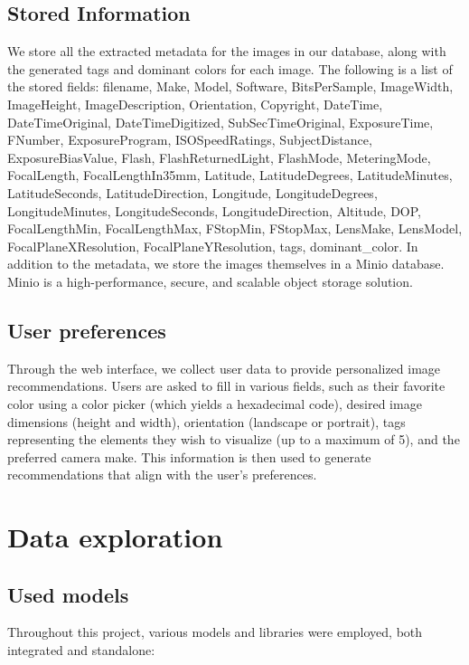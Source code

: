 \documentclass{article}
\begin{document}
    \subsection{Stored Information}\label{subsec:stored_infos}
    We store all the extracted metadata for the images in our database, along with the generated tags and dominant colors for each image.
    The following is a list of the stored fields: filename, Make, Model, Software, BitsPerSample, ImageWidth, ImageHeight, ImageDescription, Orientation, Copyright, DateTime, DateTimeOriginal, DateTimeDigitized, SubSecTimeOriginal, ExposureTime, FNumber, ExposureProgram, ISOSpeedRatings, SubjectDistance, ExposureBiasValue, Flash, FlashReturnedLight, FlashMode, MeteringMode, FocalLength, FocalLengthIn35mm, Latitude, LatitudeDegrees, LatitudeMinutes, LatitudeSeconds, LatitudeDirection, Longitude, LongitudeDegrees, LongitudeMinutes, LongitudeSeconds, LongitudeDirection, Altitude, DOP, FocalLengthMin, FocalLengthMax, FStopMin, FStopMax, LensMake, LensModel, FocalPlaneXResolution, FocalPlaneYResolution, tags, dominant\_color.
    In addition to the metadata, we store the images themselves in a Minio database.
    Minio is a high-performance, secure, and scalable object storage solution.

    \subsection{User preferences}\label{subsec:user_pref}
    Through the web interface, we collect user data to provide personalized image recommendations.
    Users are asked to fill in various fields, such as their favorite color using a color picker (which yields a hexadecimal code),
    desired image dimensions (height and width), orientation (landscape or portrait),
    tags representing the elements they wish to visualize (up to a maximum of 5), and the preferred camera make.
    This information is then used to generate recommendations that align with the user's preferences.


    \section{Data exploration}\label{sec:exploration}

    \subsection{Used models}\label{subsec:models}
    Throughout this project, various models and libraries were employed, both integrated and standalone:
\end{document}
